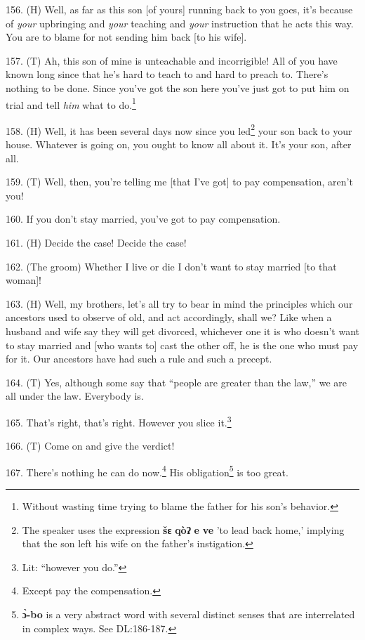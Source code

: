 156. (H)  Well, as far as
this son [of yours] running back to you goes, it's because of \textit{your} upbringing
and \textit{your} teaching and \textit{your} instruction that he acts this way.
You are to blame for not sending him back [to his wife].

157. (T)  Ah, this son of mine
is unteachable and incorrigible! All of you have known long since that he's hard
to teach to and hard to preach to. There's nothing to be done. Since you've got
the son\textit{ }here you've just got to put him on trial and tell \textit{him}
what to do.\footnote{Without wasting time trying to blame the father for his son's behavior.}

158. (H) Well, it has been several days now since you led\footnote{The speaker uses the expression \textbf{šɛ} \textbf{qòʔ} \textbf{e} \textbf{ve} 'to lead back home,' implying that the son left his wife on the father's instigation.} your son back to
your house. Whatever is going on, you ought to know all about it. It's your son,
after all.

159. (T) Well, then, you're telling me [that I've got] to pay compensation, aren't
you!

160. If you don't stay married, you've got to pay compensation.

161. (H) Decide the case! Decide the case!

162. (The groom) Whether I live or die I don't want to stay married [to that woman]!

163. (H) Well, my brothers, let's all try to bear in mind the principles which
our ancestors used to observe of old, and act accordingly, shall we? Like when
a husband and wife say they will get divorced, whichever one it is who doesn't
want to stay married and [who wants to] cast the other off, he is the one who must
pay for it. Our ancestors have had such a rule and such a precept.

164. (T) Yes, although some say that ``people are greater than the law,''
we are all under the law. Everybody is.

165. That's right, that's right. However you slice\textbf{ }it.\footnote{Lit: ``however you do.''}

166. (T) Come on and give the verdict!

167. There's nothing he can do now.\footnote{Except pay the compensation.} His obligation\footnote{\textbf{ɔ̀-bo} is a very abstract word with several distinct senses that are interrelated in complex ways. See DL:186-187.} is too great.

